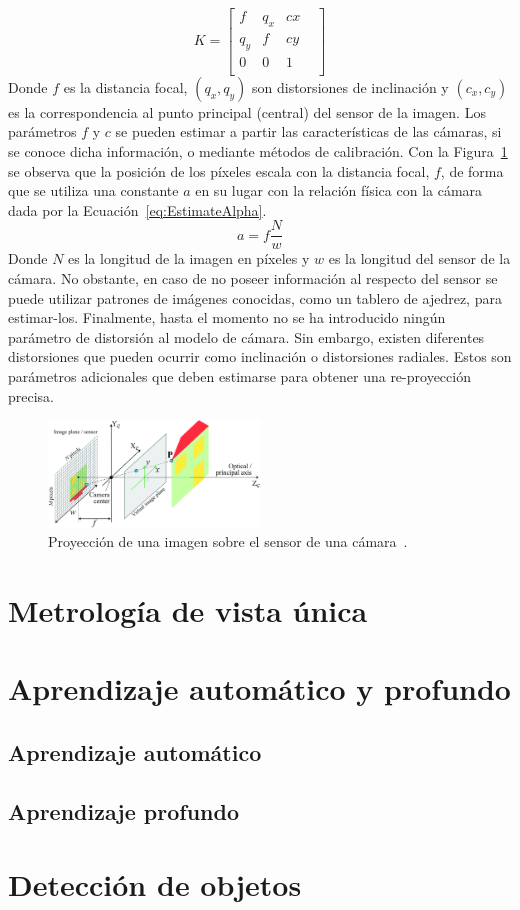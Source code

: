 \begin{equation}\label{eq:KMatrix}
    K = \begin{bmatrix}
        f & q_x & cx &\\
        q_y & f & cy &\\
        0 & 0 & 1 &\\
    \end{bmatrix}
\end{equation}
Donde $f$ es la distancia focal, $(q_x, q_y)$ son distorsiones de inclinación y $(c_x, c_y)$ es la correspondencia al punto principal (central) del sensor de la imagen.
Los parámetros $f$ y $c$ se pueden estimar a partir las características de las cámaras, si se conoce dicha información, o mediante 
métodos de calibración. Con la Figura~\ref{fig:ImageSensor} se observa que la posición de los píxeles escala 
con la distancia focal, $f$, de forma que se utiliza una constante $a$ en su lugar con la relación física con 
la cámara dada por la Ecuación~\ref{eq:EstimateAlpha}.
\begin{equation}\label{eq:EstimateAlpha}
    a = f\frac{N}{w}
\end{equation}
Donde $N$ es la longitud de la imagen en píxeles y $w$ es la longitud del sensor de la cámara.
No obstante, en caso de no poseer información al respecto del sensor se puede utilizar patrones de imágenes conocidas,
como un tablero de ajedrez, para estimar-los.
Finalmente, hasta el momento no se ha introducido ningún parámetro de distorsión al modelo de cámara. Sin embargo, 
existen diferentes distorsiones que pueden ocurrir como inclinación o distorsiones radiales. Estos son parámetros
adicionales que deben estimarse para obtener una re-proyección precisa.
\begin{figure}
\begin{center}
    \includegraphics[width=0.5\textwidth]{imagenes/chapter2/pinhole_and_sensor}
\end{center}
\caption{Proyección de una imagen sobre el sensor de una cámara~\cite{VisionBookMIT}.}
\label{fig:ImageSensor}
\end{figure}
\section{Metrología de vista única}
\section{Aprendizaje automático y profundo}
\subsection{Aprendizaje automático}
\subsection{Aprendizaje profundo}
\section{Detección de objetos}
